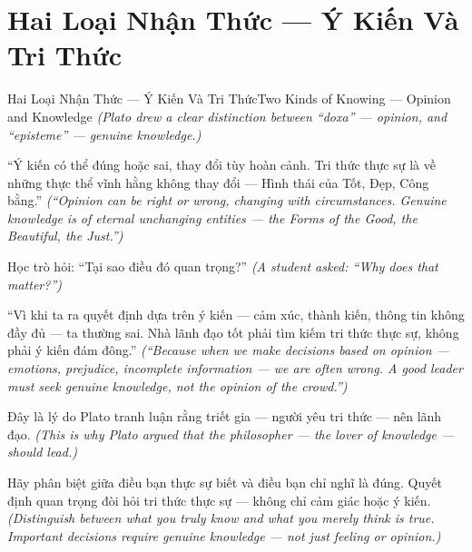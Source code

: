 \section{Hai Loại Nhận Thức — Ý Kiến Và Tri Thức}
\begin{truyen}{Hai Loại Nhận Thức — Ý Kiến Và Tri Thức}{Two Kinds of Knowing — Opinion and Knowledge}
\textit{(Plato drew a clear distinction between ``doxa'' — opinion, and ``episteme'' — genuine knowledge.)}

``Ý kiến có thể đúng hoặc sai, thay đổi tùy hoàn cảnh. Tri thức thực sự là về những thực thể vĩnh hằng không thay đổi — Hình thái của Tốt, Đẹp, Công bằng.''
\textit{(``Opinion can be right or wrong, changing with circumstances. Genuine knowledge is of eternal unchanging entities — the Forms of the Good, the Beautiful, the Just.'')}

Học trò hỏi: ``Tại sao điều đó quan trọng?''
\textit{(A student asked: ``Why does that matter?'')}

``Vì khi ta ra quyết định dựa trên ý kiến — cảm xúc, thành kiến, thông tin không đầy đủ — ta thường sai. Nhà lãnh đạo tốt phải tìm kiếm tri thức thực sự, không phải ý kiến đám đông.''
\textit{(``Because when we make decisions based on opinion — emotions, prejudice, incomplete information — we are often wrong. A good leader must seek genuine knowledge, not the opinion of the crowd.'')}

Đây là lý do Plato tranh luận rằng triết gia — người yêu tri thức — nên lãnh đạo.
\textit{(This is why Plato argued that the philosopher — the lover of knowledge — should lead.)}

\end{truyen}

\begin{baihoc}
Hãy phân biệt giữa điều bạn thực sự biết và điều bạn chỉ nghĩ là đúng. Quyết định quan trọng đòi hỏi tri thức thực sự — không chỉ cảm giác hoặc ý kiến.
\textit{(Distinguish between what you truly know and what you merely think is true. Important decisions require genuine knowledge — not just feeling or opinion.)}
\end{baihoc}
\ngancach

